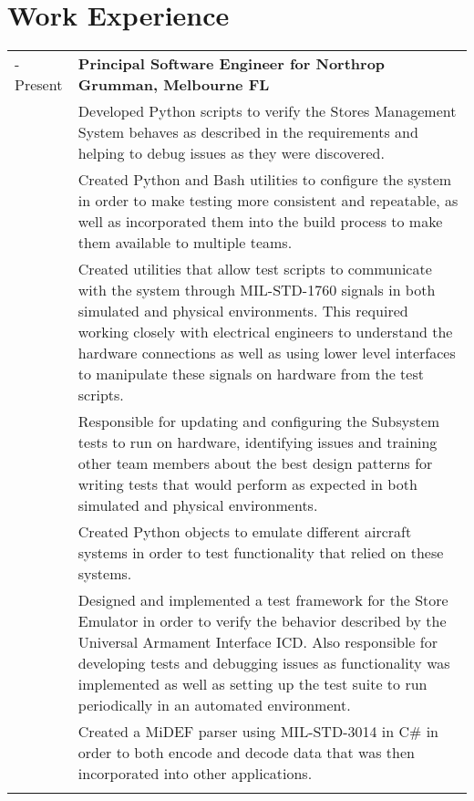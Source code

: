 \documentclass[12pt, letterpaper]{article}
\begin{document}
\section*{\selectfont Work Experience}
\vspace{-0.5cm}
\begin{longtable}{p{1in}|p{6in}}
	\centering 2019 - Present & \textbf{Principal Software Engineer for Northrop Grumman, Melbourne FL}\vspace{0.1cm}\\&
        Developed Python scripts to verify the Stores Management System behaves as described in the requirements and helping to debug issues as they were discovered.\vspace{0.2cm}\\&
        Created Python and Bash utilities to configure the system in order to make testing more consistent and repeatable, as well as incorporated them into the build process to make them available to multiple teams.\vspace{0.2cm}\\&
        Created utilities that allow test scripts to communicate with the system through MIL-STD-1760 signals in both simulated and physical environments. This required working closely with electrical engineers to understand the hardware connections as well as using lower level interfaces to manipulate these signals on hardware from the test scripts.\vspace{0.2cm}\\&
        Responsible for updating and configuring the Subsystem tests to run on hardware, identifying issues and training other team members about the best design patterns for writing tests that would perform as expected in both simulated and physical environments.\vspace{0.2cm}\\&
        Created Python objects to emulate different aircraft systems in order to test functionality that relied on these systems.\vspace{0.2cm}\\&
        Designed and implemented a test framework for the Store Emulator in order to verify the behavior described by the Universal Armament Interface ICD. Also responsible for developing tests and debugging issues as functionality was implemented as well as setting up the test suite to run periodically in an automated environment.\vspace{0.2cm}\\&
        Created a MiDEF parser using MIL-STD-3014 in C\# in order to both encode and decode data that was then incorporated into other applications.\vspace{0.2cm}\\&

\end{longtable}
\end{document}
